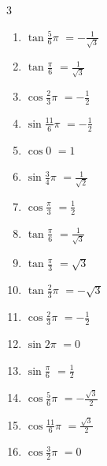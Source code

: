 \begin{multicols}{3}
\begin{enumerate}
  \item $\displaystyle \tan{\frac{5}{6}\pi}$
        $\displaystyle =-\frac{1}{\sqrt{3}}$

  \item $\displaystyle \tan{\frac{\pi}{6}}$
        $\displaystyle =\frac{1}{\sqrt{3}}$

  \item $\displaystyle \cos{\frac{2}{3}\pi}$
        $\displaystyle =-\frac{1}{2}$

  \item $\displaystyle \sin{\frac{11}{6}\pi}$
        $\displaystyle =-\frac{1}{2}$

\columnbreak %

\resetques

  \item $\displaystyle \cos{0}$
        $\displaystyle =1$

  \item $\displaystyle \sin{\frac{3}{4}\pi}$
        $\displaystyle =\frac{1}{\sqrt{2}}$

  \item $\displaystyle \cos{\frac{\pi}{3}}$
        $\displaystyle =\frac{1}{2}$

  \item $\displaystyle \tan{\frac{\pi}{6}}$
        $\displaystyle =\frac{1}{\sqrt{3}}$

  \item $\displaystyle \tan{\frac{\pi}{3}}$
        $\displaystyle =\sqrt{3}$

  \item $\displaystyle \tan{\frac{2}{3}\pi}$
        $\displaystyle =-\sqrt{3}$

  \item $\displaystyle \cos{\frac{2}{3}\pi}$
        $\displaystyle =-\frac{1}{2}$

  \item $\displaystyle \sin{2\pi}$
        $\displaystyle =0$

  \item $\displaystyle \sin{\frac{\pi}{6}}$
        $\displaystyle =\frac{1}{2}$

  \item $\displaystyle \cos{\frac{5}{6}\pi}$
        $\displaystyle =-\frac{\sqrt{3}}{2}$

  \item $\displaystyle \cos{\frac{11}{6}\pi}$
        $\displaystyle =\frac{\sqrt{3}}{2}$

  \item $\displaystyle \cos{\frac{3}{2}\pi}$
        $\displaystyle =0$


\end{enumerate}
\end{multicols}
